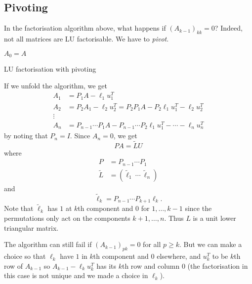 \documentclass[a4paper]{article}
\begin{document}
\subsection{Pivoting}

In the factorisation algorithm above, what happens if \((A_{k - 1})_{kk} = 0\)? Indeed, not all matrices are LU factorisable. We have to \emph{pivot}.

\begin{algorithm}
  \(A_0 = A\)\;
  \caption{LU factorisation with pivoting}
\end{algorithm}

If we unfold the algorithm, we get
\begin{align*}
  A_1 &= P_1A - \ell_1u_1^T \\
  A_2 &= P_2A_1 - \ell_2u_2^T = P_2P_1A - P_2\ell_1u_1^T - \ell_2u_2^T \\
  \vdots \\
  A_n &= P_{n - 1} \cdots P_1A - P_{n - 1} \cdots P_2 \ell_1 u_1^T - \cdots - \ell_nu_n^T
\end{align*}
by noting that \(P_n = I\). Since \(A_n = 0\), we get
\[
  PA = \tilde L U
\]
where
\begin{align*}
  P &= P_{n - 1} \cdots P_1 \\
  \tilde L &= (\tilde \ell_1 \  \cdots \  \tilde \ell_n)
\end{align*}
and
\[
  \tilde \ell_k = P_{n - 1} \cdots P_{k + 1} \ell_k.
\]
Note that \(\tilde \ell_k\) has \(1\) at \(k\)th component and \(0\) for \(1, \dots, k - 1\) since the permutations only act on the components \(k + 1, \dots, n\). Thus \(L\) is a unit lower triangular matrix.

\begin{note}
  The algorithm can still fail if \((A_{k - 1})_{pk} = 0\) for all \(p \geq k\). But we can make a choice so that \(\ell_k\) have \(1 \) in \(k\)th component and \(0\) elsewhere, and \(u_k^T\) to be \(k\)th row of \(A_{k - 1}\) so \(A_{k - 1} - \ell_ku_k^T\) has its \(k\)th row and column \(0\) (the factorisation in this case is not unique and we made a choice in \(\ell_k\)).
\end{note}
\end{document}
